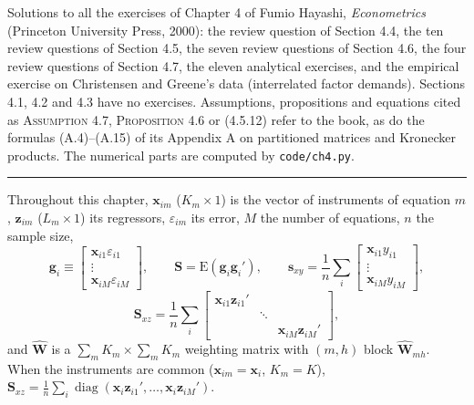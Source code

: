 \documentclass[11pt,letterpaper,reqno]{amsart}
\newcommand{\E}{\mathrm{E}}                  %
\newcommand{\wh}[1]{\widehat{#1}}
\DeclareMathOperator{\diag}{diag}
\newcommand{\bk}[1]{\textup{\textsc{#1}}}
\begin{document}
\begin{center}
\begin{minipage}{0.86\textwidth}
\small
Solutions to all the exercises of Chapter 4 of Fumio Hayashi, \emph{Econometrics} (Princeton University
Press, 2000): the review question of Section 4.4, the ten review questions of Section 4.5, the seven review
questions of Section 4.6, the four review questions of Section 4.7, the eleven analytical exercises, and the
empirical exercise on Christensen and Greene's data (interrelated factor demands).  Sections 4.1, 4.2 and 4.3
have no exercises.  Assumptions, propositions and equations cited as \bk{Assumption 4.7},
\bk{Proposition 4.6} or \bk{(4.5.12)} refer to the book, as do the formulas \bk{(A.4)}--\bk{(A.15)} of its
Appendix A on partitioned matrices and Kronecker products.  The numerical parts are computed by
\texttt{code/ch4.py}.
\end{minipage}
\end{center}

\bigskip
\hrule
\bigskip

Throughout this chapter, $\mathbf{x}_{im}$ ($K_m\times 1$) is the vector of instruments of equation $m$,
$\mathbf{z}_{im}$ ($L_m\times 1$) its regressors, $\varepsilon_{im}$ its error, $M$ the number of equations,
$n$ the sample size,
\[
\mathbf{g}_i\equiv
\begin{bmatrix}\mathbf{x}_{i1}\varepsilon_{i1}\\ \vdots\\ \mathbf{x}_{iM}\varepsilon_{iM}\end{bmatrix},
\qquad
\mathbf{S}=\E(\mathbf{g}_i\mathbf{g}_i'),
\qquad
\mathbf{s}_{xy}=\frac1n\sum_i
\begin{bmatrix}\mathbf{x}_{i1}y_{i1}\\ \vdots\\ \mathbf{x}_{iM}y_{iM}\end{bmatrix},
\]
\[
\mathbf{S}_{xz}=\frac1n\sum_i
\begin{bmatrix}\mathbf{x}_{i1}\mathbf{z}_{i1}' & & \\ & \ddots & \\
& & \mathbf{x}_{iM}\mathbf{z}_{iM}'\end{bmatrix},
\]
and $\wh{\mathbf{W}}$ is a $\sum_m K_m\times\sum_m K_m$ weighting matrix with $(m,h)$ block
$\wh{\mathbf{W}}_{mh}$.  When the instruments are common ($\mathbf{x}_{im}=\mathbf{x}_i$, $K_m=K$),
$\mathbf{S}_{xz}=\frac1n\sum_i\diag(\mathbf{x}_i\mathbf{z}_{i1}',\dots,\mathbf{x}_i\mathbf{z}_{iM}')$.
\end{document}
